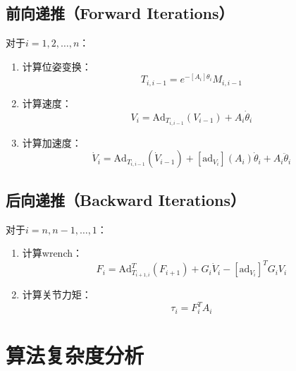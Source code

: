 \documentclass[12pt,a4paper]{article}
\begin{document}
    \subsection{前向递推（Forward Iterations）}
    
    对于$i = 1, 2, \ldots, n$：
    
    \begin{enumerate}
    \item 计算位姿变换：
    \begin{equation}
    T_{i,i-1} = e^{-[A_i]\theta_i} M_{i,i-1}
    \end{equation}
    
    \item 计算速度：
    \begin{equation}
    V_i = \text{Ad}_{T_{i,i-1}}(V_{i-1}) + A_i \dot{\theta}_i
    \end{equation}
    
    \item 计算加速度：
    \begin{equation}
    \dot{V}_i = \text{Ad}_{T_{i,i-1}}(\dot{V}_{i-1}) + [\text{ad}_{V_i}](A_i) \dot{\theta}_i + A_i \ddot{\theta}_i
    \end{equation}
    \end{enumerate}
    
    \subsection{后向递推（Backward Iterations）}
    
    对于$i = n, n-1, \ldots, 1$：
    
    \begin{enumerate}
    \item 计算wrench：
    \begin{equation}
    F_i = \text{Ad}_{T_{i+1,i}}^T(F_{i+1}) + G_i \dot{V}_i - [\text{ad}_{V_i}]^T G_i V_i
    \end{equation}
    
    \item 计算关节力矩：
    \begin{equation}
    \tau_i = F_i^T A_i
    \end{equation}
    \end{enumerate}
    
    \section{算法复杂度分析}
    
\end{document}
